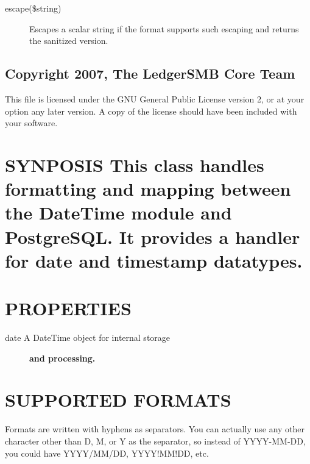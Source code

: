 \begin{description}
\begin{description}
\begin{description}
\begin{description}
\begin{description}
\begin{description}
\begin{description}
\begin{description}
\begin{description}
\begin{description}
\begin{description}
\item[{escape(\$string)}] \mbox{}

Escapes a scalar string if the format supports such escaping and returns the
sanitized version.

\end{description}
\subsection*{Copyright 2007, The LedgerSMB Core Team\label{LedgerSMB::Template_Copyright_2007_The_LedgerSMB_Core_Team}}


This file is licensed under the GNU General Public License version 2, or at your
option any later version.  A copy of the license should have been included with
your software.

\section{SYNPOSIS
This class handles formatting and mapping between the DateTime module and
PostgreSQL. It provides a handler for date and timestamp datatypes.\label{SYNPOSIS_This_class_handles_formatting_and_mapping_between_the_DateTime_module_and_PostgreSQL_It_provides_a_handler_for_date_and_timestamp_datatypes_}}
\section{PROPERTIES\label{PROPERTIES}}
\begin{description}

\item[{date A DateTime object for internal storage}] \textbf{and processing.}\end{description}
\section{SUPPORTED FORMATS\label{SUPPORTED_FORMATS}}


Formats are written with hyphens as separators.  You can actually use any other
character other than D, M, or Y as the separator, so instead of YYYY-MM-DD, you
could have YYYY/MM/DD, YYYY!MM!DD, etc.




\end{description}
\end{description}
\end{description}
\end{description}
\end{description}
\end{description}
\end{description}
\end{description}
\end{description}
\end{description}
